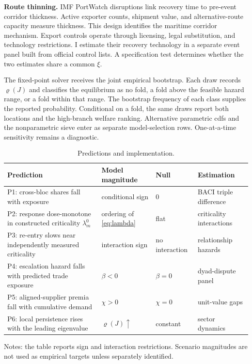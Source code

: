 \documentclass[11pt]{article}
\theoremstyle{definition}
\begin{document}
\medskip
\noindent\textbf{Route thinning.} IMF PortWatch disruptions link recovery time to pre-event corridor thickness. Active exporter counts, shipment value, and alternative-route capacity measure thickness. This design identifies the maritime corridor mechanism. Export controls operate through licensing, legal substitution, and technology restrictions. I estimate their recovery technology in a separate event panel built from official control lists. A specification test determines whether the two estimates share a common $\xi$.

The fixed-point solver receives the joint empirical bootstrap. Each draw records $\varrho(J)$ and classifies the equilibrium as no fold, a fold above the feasible hazard range, or a fold within that range. The bootstrap frequency of each class supplies the reported probability. Conditional on a fold, the same draws report both locations and the high-branch welfare ranking. Alternative parametric cdfs and the nonparametric sieve enter as separate model-selection rows. One-at-a-time sensitivity remains a diagnostic.

\begin{table}[t]
\centering
\caption{Predictions and implementation.}
\label{tab:evidence3}
\small
\begin{tabular}{p{6.6cm}p{3.4cm}p{2.1cm}p{1.9cm}}
\toprule
Prediction & Model magnitude & Null & Estimation \\
\midrule
P1: cross-bloc shares fall with exposure & conditional sign & 0 & BACI triple difference \\
P2: response dose-monotone in constructed criticality $\lambda^0_m$ & ordering of \eqref{eq:lambda} & flat & criticality interactions \\
P3: re-entry slows near independently measured criticality & interaction sign & no interaction & relationship hazards \\
P4: escalation hazard falls with predicted trade exposure & $\beta<0$ & $\beta=0$ & dyad-dispute panel \\
P5: aligned-supplier premia fall with cumulative demand & $\chi>0$ & $\chi=0$ & unit-value gaps \\
P6: local persistence rises with the leading eigenvalue & $\varrho(J)\uparrow$ & constant & sector dynamics \\
\bottomrule
\end{tabular}
\par\smallskip
\begin{minipage}{0.95\textwidth}
\footnotesize Notes: the table reports sign and interaction restrictions. Scenario magnitudes are not used as empirical targets unless separately identified.
\end{minipage}
\end{table}
\end{document}
